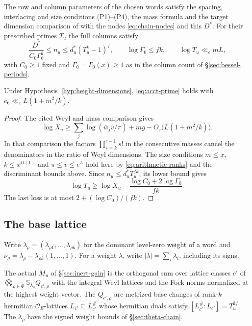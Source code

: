 \begin{hypothesis}[\openinput]\label{hyp:height-dimensions}
The row and column parameters of the chosen words satisfy the spacing,
interlacing and size conditions (P1)--(P4), the mass formula and the
target dimension comparison of
\citep[Proposition~15.25]{adriazola-grh} with the nodes
\eqref{eq:chain-nodes} and this $D^*$. For their prescribed primes
$T_u$ the full columns satisfy
\[
 \frac{D^*}{C_0\Gamma_0^2}\le n_u\le d_u^*(T_u^k-1)^f,\qquad
 \log\Gamma_0\le fk,\qquad \log T_u\ll_\varepsilon mL ,
\]
with $C_0\ge1$ fixed and $\Gamma_0=\Gamma_0(x)\ge1$ as in the column count of
\S\ref{sec:bessel-periods}.
\end{hypothesis}

\begin{proposition}\label{prop:height-prime}
Under Hypothesis~\ref{hyp:height-dimensions}, \eqref{eq:acct-prime}
holds with $e_6\ll_\varepsilon L(1+m^2/k)$.
\end{proposition}

\begin{proof}
The cited Weyl and mass comparison gives
\[
 \log X_u\ge\sum_j\log(\bar w_j v/\pi)+mg
                              -O_\varepsilon\bigl(L(1+m^2/k)\bigr).
\]
In that comparison the factors $\prod_{s=k}^{r-1}s!$ in the consecutive
masses cancel the denominators in the ratio of Weyl dimensions.
The size conditions $m\le x$, $k\le x^{O(1)}$ and
$\pi\le v\le e^L$ hold here by \eqref{eq:arithmetic-ranks} and the
discriminant bounds above. Since $n_u\le d_u^*T_u^{fk}$, its lower
bound gives
\[
 \log T_u\ge\log X_u-\frac{\log C_0+2\log\Gamma_0}{fk}.
\]
The last loss is at most $2+(\log C_0)/(fk)$.
\end{proof}

\subsection{The base lattice}

Write $\lambda_\rho=(\lambda_{\rho1},\ldots,\lambda_{\rho k})$ for
the dominant level-zero weight of a word and
$\nu_\rho=\lambda_\rho-\lambda_{\rho k}(1,\ldots,1)$.
For a weight $\lambda$, write $|\lambda|=\sum_i\lambda_i$, including
its signs.

\begin{hypothesis}[\openinput]\label{hyp:height-base}
The actual $M_u$ of \S\ref{sec:inert-gain} is the orthogonal sum over
lattice classes $c'$ of $\bigotimes_{\rho\in\Phi}
\mathbb S_{\lambda_\rho}Q_{c',\rho}$ with the integral Weyl lattices
and the Fock norms normalized at the highest weight vector. The
$Q_{c',\rho}$ are metrized base changes of rank-$k$ hermitian
$\mathcal O_E$-lattices $L_{c'}\subseteq L_{c'}^\#$ whose hermitian
duals satisfy $[L_{c'}^\#:L_{c'}]=T_u^{2f}$. The $\lambda_\rho$
have the signed weight bounds of \S\ref{sec:theta-chain}.
\end{hypothesis}

